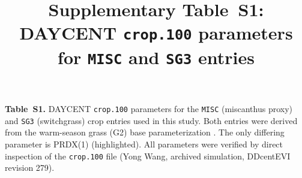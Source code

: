 \documentclass[11pt]{article}
\title{Supplementary Table~S1: DAYCENT \texttt{crop.100} parameters for \texttt{MISC} and \texttt{SG3} entries}
\author{}
\date{}
\begin{document}
\maketitle

\begin{center}
\textbf{Table~S1.} DAYCENT \texttt{crop.100} parameters for the \texttt{MISC} (miscanthus proxy) and
\texttt{SG3} (switchgrass) crop entries used in this study. Both entries were derived from the
warm-season grass (G2) base parameterization \citep{WangDou2017DAYCENT,WangDou2020AgronomyJ}.
The only differing parameter is PRDX(1) (highlighted). All parameters were verified by direct
inspection of the \texttt{crop.100} file (Yong Wang, archived simulation, DDcentEVI revision 279).
\end{center}

\vspace{1em}
\end{document}
